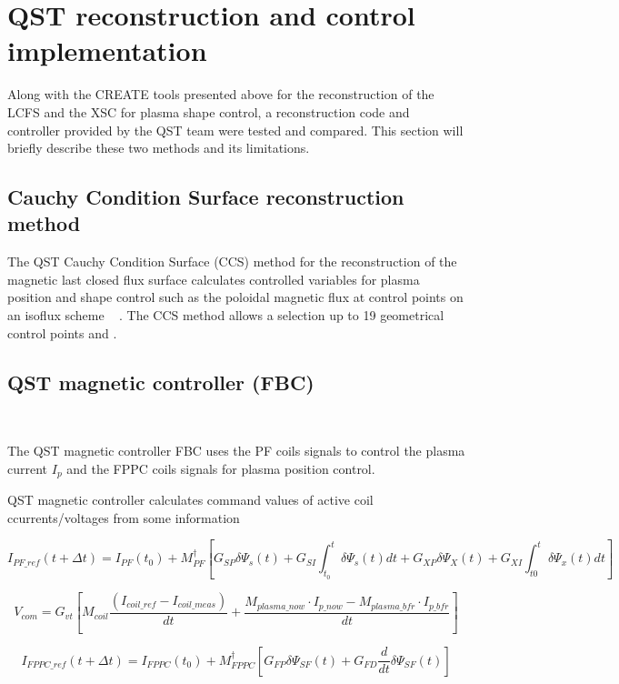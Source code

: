 \section{QST reconstruction and control implementation}

Along with the CREATE tools presented above  for the reconstruction of the LCFS and the XSC for plasma shape control, a reconstruction code and controller provided by the QST team were tested and compared. This section will briefly describe these two methods and its limitations.  

\subsection{Cauchy Condition Surface reconstruction  method }
The QST Cauchy Condition Surface (CCS) method for the reconstruction of the magnetic last closed flux surface calculates controlled variables for plasma position and shape control such as the poloidal magnetic flux at control points on an isoflux scheme  ~\cite{CCS} . The CCS method allows a selection up to 19 geometrical control points and . 

\subsection{QST magnetic controller (FBC)}

~\cite{FBC}

The QST magnetic controller FBC uses the PF coils signals to control the plasma current $I_p$ and the FPPC coils signals for plasma position control.

QST magnetic controller calculates command values of active coil ccurrents/voltages from some information

\begin{equation}
I_{PF\_ref}(t+\Delta t) = I_{PF}(t_0)+M^\dagger_{PF}\left[G_{SP}\delta\Psi_s(t)+G_{SI}\int_{t_0}^{t}\delta\Psi_s(t)dt+G_{XP}\delta\Psi_X(t)+G_{XI}\int_{t0}^{t}\delta\Psi_x(t)dt\right]
\end{equation}

\begin{equation}
V_{com}=G_{vt}\left[M_{coil}\frac{(I_{coil\_ref}-I_{coil\_meas})}{dt}+ \frac{M_{plasma\_now} \cdot I_{p\_now} - M_{plasma\_ bfr} \cdot I_{p\_bfr}}{dt}\right]
\end{equation}

\begin{equation}
I_{FPPC\_ref}(t+\Delta t)=I_{FPPC}(t_0)+ M^\dagger_{FPPC}\left[G_{FP}\delta \Psi_{SF}(t) + G_{FD}\frac{d}{dt}\delta\Psi_{SF}(t) \right]
\end{equation}



